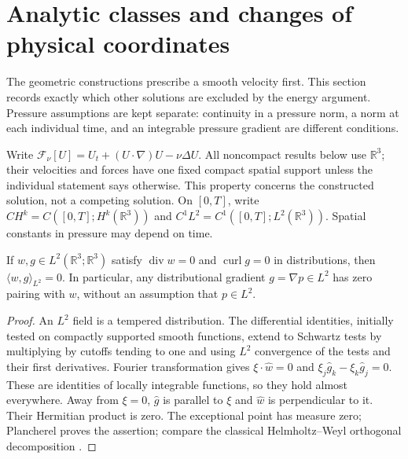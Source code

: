 \section{Analytic classes and changes of physical coordinates}\label{sec:model}
The geometric constructions prescribe a smooth velocity first. This section
records exactly which other solutions are excluded by the energy argument.
Pressure assumptions are kept separate: continuity in a pressure norm, a
norm at each individual time, and an integrable pressure gradient are
different conditions.

Write $\mathcal F_\nu[U]=U_t+(U\cdot\nabla)U-\nu\Delta U$.
All noncompact results below use $\mathbb R^3$; their velocities and forces
have one fixed compact spatial support unless the individual statement
says otherwise. This property concerns the constructed solution, not a
competing solution. On $[0,T]$, write $CH^k=C([0,T];H^k(\mathbb R^3))$
and $C^1L^2=C^1([0,T];L^2(\mathbb R^3))$. Spatial constants in pressure
may depend on time.

\begin{lemma}\label{lem:b-gradient}
If $w,g\in L^2(\mathbb R^3;\mathbb R^3)$ satisfy
$\operatorname{div}w=0$ and $\operatorname{curl}g=0$ in distributions, then
$\langle w,g\rangle_{L^2}=0$. In particular, any distributional gradient
$g=\nabla p\in L^2$ has zero pairing with $w$, without an assumption that
$p\in L^2$.
\end{lemma}
\begin{proof}
An $L^2$ field is a tempered distribution. The differential identities,
initially tested on compactly supported smooth functions, extend to
Schwartz tests by multiplying by cutoffs tending to one and using $L^2$
convergence of the tests and their first derivatives. Fourier transformation
gives $\xi\cdot\widehat w=0$ and
$\xi_j\widehat g_k-\xi_k\widehat g_j=0$. These are identities of locally
integrable functions, so they hold almost everywhere. Away from $\xi=0$,
$\widehat g$ is parallel to $\xi$ and $\widehat w$ is perpendicular to it.
Their Hermitian product is zero. The exceptional point has measure zero;
Plancherel proves the assertion; compare the classical Helmholtz--Weyl orthogonal decomposition \cite{Helmholtz1858,Weyl1940,ConstantinFoias1988,Galdi2011}.
\end{proof}

